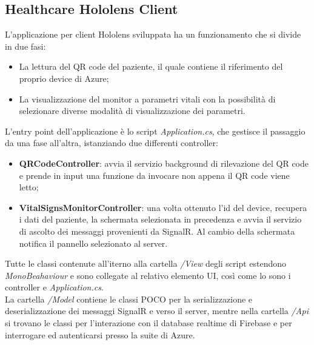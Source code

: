 \subsection{Healthcare Hololens Client}

L'applicazione per client Hololens sviluppata ha un funzionamento che si divide in due fasi:
\begin{itemize}
    \item La lettura del QR code del paziente, il quale contiene il riferimento del proprio device di Azure;
    \item La visualizzazione del monitor a parametri vitali con la possibilità di selezionare diverse modalità di visualizzazione dei parametri.
\end{itemize}

L'entry point dell'applicazione è lo script \textit{Application.cs}, che gestisce il passaggio da una fase all'altra, istanziando due differenti controller:
\begin{itemize}
    \item \textbf{QRCodeController}: avvia il servizio background di rilevazione del QR code e prende in input una funzione da invocare non appena il QR code viene letto;
    
    \item \textbf{VitalSignsMonitorController}: una volta ottenuto l'id del device, recupera i dati del paziente\footnotemark{}, la schermata selezionata in precedenza e avvia il servizio di ascolto dei messaggi provenienti da SignalR. Al cambio della schermata notifica il pannello selezionato al server\footnotemark[\value{footnote}].
\end{itemize}

Tutte le classi contenute all'iterno alla cartella \textit{/View} degli script estendono \textit{MonoBeahaviour} e sono collegate al relativo elemento UI, così come lo sono i controller e \textit{Application.cs}.\\

La cartella \textit{/Model} contiene le classi POCO per la serializzazione e deserializzazione dei messaggi SignalR e verso il server, mentre nella cartella \textit{/Api} si trovano le classi per l'interazione con il database realtime di Firebase e per interrogare ed autenticarsi presso la suite di Azure.


